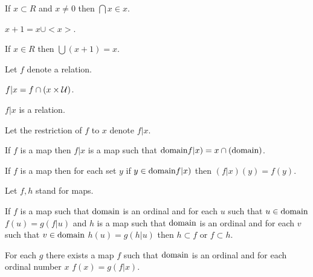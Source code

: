 \documentclass[a4paper,draft]{amsproc}
\begin{document}
\begin{forthel}
\begin{theorem}[121]
If $x \subset R$ and $x \neq 0$ then $\bigcap x \in x$.
\end{theorem}

\begin{definition}[122]
$x + 1 = x \cup <x>$.
\end{definition}


\begin{theorem}[124]
If $x \in R$ then $\bigcup (x + 1) = x$.
\end{theorem}

Let $f$ denote a relation.
\begin{definition}
$f | x = f \cap (x \times \cal{U})$.
\end{definition}

\begin{lemma}
$f | x$ is a relation.
\end{lemma}

Let the restriction of $f$ to $x$ denote $f | x$.

\begin{theorem}[126a]
If $f$ is a map then $f | x$ is a map such that $\domain (f | x) = x \cap (\domain f)$.
\end{theorem}

\begin{theorem}[126b]
If $f$ is a map then for each set $y$ if $y \in \domain (f | x)$ then $(f | x)(y) = f(y)$.
\end{theorem}

Let $f, h$ stand for maps.
\begin{theorem}[127]
If $f$ is a map such that $\domain f$ is an ordinal and for each $u$ such that $u \in \domain f$ $f(u) = g(f | u)$
and $h$ is a map such that $\domain h$ is an ordinal and for each $v$ such that $v \in \domain h$ $h(u) = g(h | u)$
then $h \subset f$ or $f \subset h$.
\end{theorem}

\begin{theorem}[128]
For each $g$ there exists a %
map $f$ such that $\domain f$ is an ordinal
and for each ordinal number $x$ $f(x) = g(f | x)$.
\end{theorem}

\end{forthel}
\end{document}
